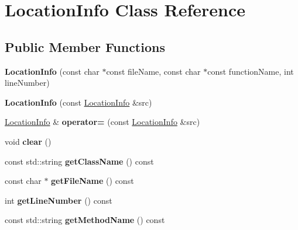 \hypertarget{classLocationInfo}{}\section{Location\+Info Class Reference}
\label{classLocationInfo}
\subsection*{Public Member Functions}
\begin{DoxyCompactItemize}
\item 
\mbox{\label{classLocationInfo_a4b06985e611909d43960288c9964e515}} 
{\bfseries Location\+Info} (const char $\ast$const file\+Name, const char $\ast$const function\+Name, int line\+Number)
\item 
\mbox{\label{classLocationInfo_a9b40bad9e1798f954e59a477f39b76d1}} 
{\bfseries Location\+Info} (const \hyperlink{classLocationInfo}{Location\+Info} \&src)
\item 
\mbox{\label{classLocationInfo_a904ae95cc25e399360b11e42c6190e02}} 
\hyperlink{classLocationInfo}{Location\+Info} \& {\bfseries operator=} (const \hyperlink{classLocationInfo}{Location\+Info} \&src)
\item 
\mbox{\label{classLocationInfo_a5a2dcf4157dfa2c86ebf88905c6bd82b}} 
void {\bfseries clear} ()
\item 
\mbox{\label{classLocationInfo_afa1d328336fdcc03e1b3c856292669c8}} 
const std\+::string {\bfseries get\+Class\+Name} () const
\item 
\mbox{\label{classLocationInfo_a199a56381dc81b19309a7a37e347b3eb}} 
const char $\ast$ {\bfseries get\+File\+Name} () const
\item 
\mbox{\label{classLocationInfo_a7d78bc8f092ff9e5e70483fef6c230ac}} 
int {\bfseries get\+Line\+Number} () const
\item 
\mbox{\label{classLocationInfo_a537f5a6bfd058721ca533f8b24babaab}} 
const std\+::string {\bfseries get\+Method\+Name} () const
\end{DoxyCompactItemize}
